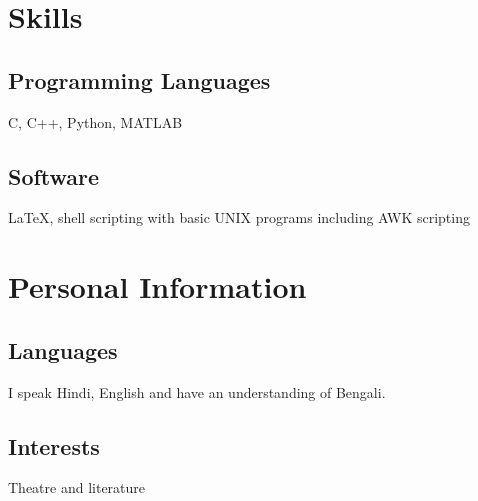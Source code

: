 \documentclass{article}
\begin{document}
\section{Skills}

\subsection{Programming Languages}
C, C++, Python, MATLAB

\subsection{Software}
\LaTeX,
shell scripting with basic UNIX programs
including AWK scripting


\section{Personal Information}

\subsection{Languages}
I speak Hindi, English
and have an understanding of Bengali.
\subsection{Interests}
Theatre and literature
\end{document}
